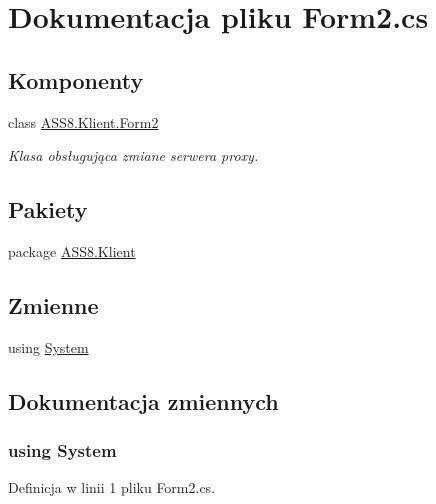 \hypertarget{a00043}{
\section{Dokumentacja pliku Form2.cs}
\label{d6/d42/a00043}
}
\subsection*{Komponenty}
\begin{CompactItemize}
\item 
class \hyperlink{a00004}{ASS8.Klient.Form2}
\begin{CompactList}\small\item\em Klasa obsługująca zmiane serwera proxy. \item\end{CompactList}\end{CompactItemize}
\subsection*{Pakiety}
\begin{CompactItemize}
\item 
package \hyperlink{a00060}{ASS8.Klient}
\end{CompactItemize}
\subsection*{Zmienne}
\begin{CompactItemize}
\item 
﻿using \hyperlink{a00043_81a223a02c34d82b47199f08308847f2}{System}
\end{CompactItemize}


\subsection{Dokumentacja zmiennych}
\hypertarget{a00043_81a223a02c34d82b47199f08308847f2}{
\subsubsection[{System}]{\setlength{\rightskip}{0pt plus 5cm}﻿using {\bf System}}}
\label{d6/d42/a00043_81a223a02c34d82b47199f08308847f2}




Definicja w linii 1 pliku Form2.cs.